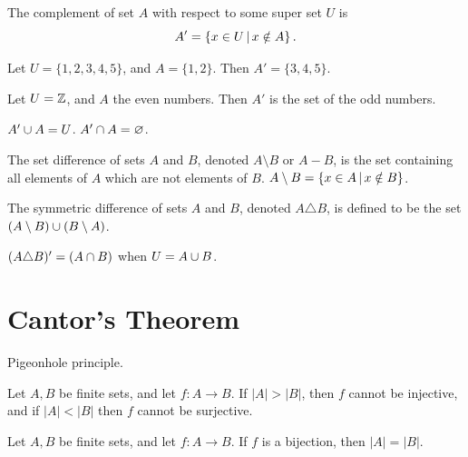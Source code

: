 \begin{defn}
    The complement of set $A$ with respect to some super set $U$ is
    \[A' = \left\{x \in U \,\middle|\, x \notin A\right\}.\]
\end{defn}

\begin{exmp}
    Let $U = \{1, 2, 3, 4, 5\}$, and $A = \{1, 2\}$. Then $A' = \{3, 4, 5\}$.
\end{exmp}

\begin{exmp}
    Let $U = \mathbb{Z}$, and $A$ the even numbers. Then $A'$ is the set of the odd numbers.
\end{exmp}

\begin{rmk}
    $A' \cup A = U$. $A' \cap A = \varnothing$.
\end{rmk}

\begin{defn}\label{set-difference}
    The set difference of sets $A$ and  $B$, denoted $A \setminus B$ or $A - B$, is the set containing all elements of $A$ which are not elements of $B$. $A \setminus B = \left\{x \in A \,\middle|\, x \notin B\right\}$.
\end{defn}

\begin{defn}\label{symmetric-difference}
    The symmetric difference of sets $A$ and $B$, denoted $A \triangle B$, is defined to be the set $(A \setminus B) \cup (B \setminus A)$.
\end{defn}

\begin{rmk}
    $(A \triangle B)' = (A \cap B)$ when $U = A \cup B$.
\end{rmk}


\section{Cantor's Theorem}

\begin{thm}\label{pigeonhole}
    Pigeonhole principle.

    Let $A, B$ be finite sets, and let $f: A \to B$. If $|A| > |B|$, then $f$ cannot be injective, and if $|A| < |B|$ then $f$ cannot be surjective.
\end{thm}

\begin{prop}
    Let $A, B$ be finite sets, and let $f: A \to B$. If $f$ is a bijection, then $|A| = |B|$.
\end{prop}

